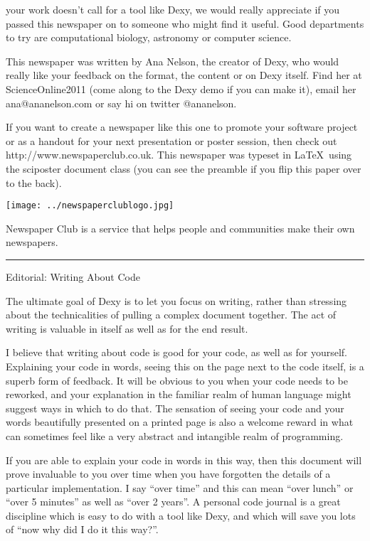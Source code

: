 \documentclass[custom, plainsections]{sciposter}
\begin{document}
\begin{multicols*}{3}
 your work doesn't call for a tool like Dexy, we would really appreciate if you passed this newspaper on to someone who might find it useful. Good departments to try are computational biology, astronomy or computer science.

This newspaper was written by Ana Nelson, the creator of Dexy, who would really like your feedback on the format, the content or on Dexy itself. Find her at ScienceOnline2011 (come along to the Dexy demo if you can make it), email her ana@ananelson.com or say hi on twitter @ananelson.

If you want to create a newspaper like this one to promote your software project or as a handout for your next presentation or poster session, then check out http://www.newspaperclub.co.uk. This newspaper was typeset in \LaTeX~using the sciposter document class (you can see the preamble if you flip this paper over to the back).

\texttt{[image: ../newspaperclublogo.jpg]}

Newspaper Club is a service that helps people and communities make their own newspapers.

\vspace{10pt}
\hrule
\vspace{10pt}


\large
Editorial: Writing About Code
\vspace{5pt}
\small

The ultimate goal of Dexy is to let you focus on writing, rather than stressing about the technicalities of pulling a complex document together. The act of writing is valuable in itself as well as for the end result.

I believe that writing about code is good for your code, as well as for yourself. Explaining your code in words, seeing this on the page next to the code itself, is a superb form of feedback. It will be obvious to you when your code needs to be reworked, and your explanation in the familiar realm of human language might suggest ways in which to do that. The sensation of seeing your code and your words beautifully presented on a printed page is also a welcome reward in what can sometimes feel like a very abstract and intangible realm of programming.

If you are able to explain your code in words in this way, then this document will prove invaluable to you over time when you have forgotten the details of a particular implementation. I say ``over time'' and this can mean ``over lunch'' or ``over 5 minutes'' as well as ``over 2 years''. A personal code journal is a great discipline which is easy to do with a tool like Dexy, and which will save you lots of ``now why did I do it this way?''.


\end{multicols*}
\end{document}
